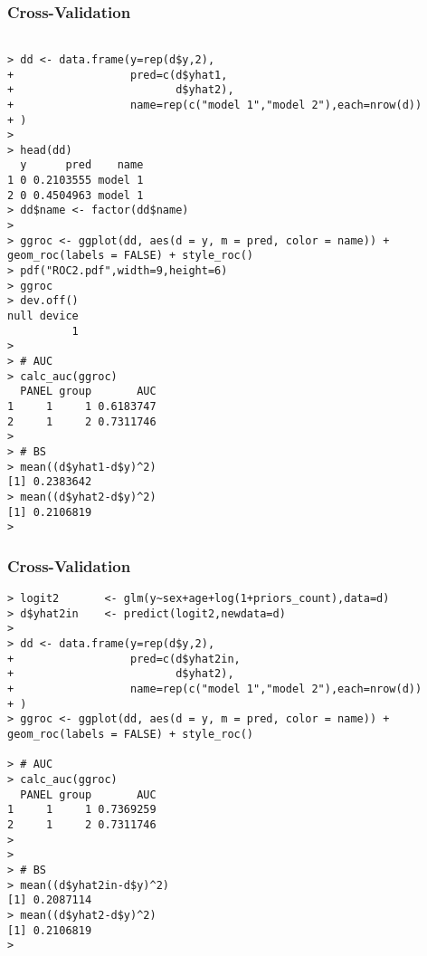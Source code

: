 \documentclass[xcolor=dvipsnames]{beamer}
\begin{document}
\begin{frame}[fragile]
\frametitle{Cross-Validation}
\begin{Verbatim}[fontsize=\tiny, frame=single, label=R Code]

> dd <- data.frame(y=rep(d$y,2),
+                  pred=c(d$yhat1,
+                         d$yhat2),
+                  name=rep(c("model 1","model 2"),each=nrow(d))
+ )
> 
> head(dd)
  y      pred    name
1 0 0.2103555 model 1
2 0 0.4504963 model 1
> dd$name <- factor(dd$name)
> 
> ggroc <- ggplot(dd, aes(d = y, m = pred, color = name)) + geom_roc(labels = FALSE) + style_roc() 
> pdf("ROC2.pdf",width=9,height=6)
> ggroc 
> dev.off()
null device 
          1 
> 
> # AUC
> calc_auc(ggroc)
  PANEL group       AUC
1     1     1 0.6183747
2     1     2 0.7311746
> 
> # BS
> mean((d$yhat1-d$y)^2)
[1] 0.2383642
> mean((d$yhat2-d$y)^2)
[1] 0.2106819
> \end{Verbatim}
\end{frame}


\begin{frame}[fragile]
\frametitle{Cross-Validation}
\begin{Verbatim}[fontsize=\tiny, frame=single, label=R Code]
> logit2       <- glm(y~sex+age+log(1+priors_count),data=d)
> d$yhat2in    <- predict(logit2,newdata=d)
> 
> dd <- data.frame(y=rep(d$y,2),
+                  pred=c(d$yhat2in,
+                         d$yhat2),
+                  name=rep(c("model 1","model 2"),each=nrow(d))
+ )
> ggroc <- ggplot(dd, aes(d = y, m = pred, color = name)) + geom_roc(labels = FALSE) + style_roc() 

> # AUC
> calc_auc(ggroc)
  PANEL group       AUC
1     1     1 0.7369259
2     1     2 0.7311746
> 
> 
> # BS
> mean((d$yhat2in-d$y)^2)
[1] 0.2087114
> mean((d$yhat2-d$y)^2)
[1] 0.2106819
> \end{Verbatim}
\end{frame}

\end{document}
